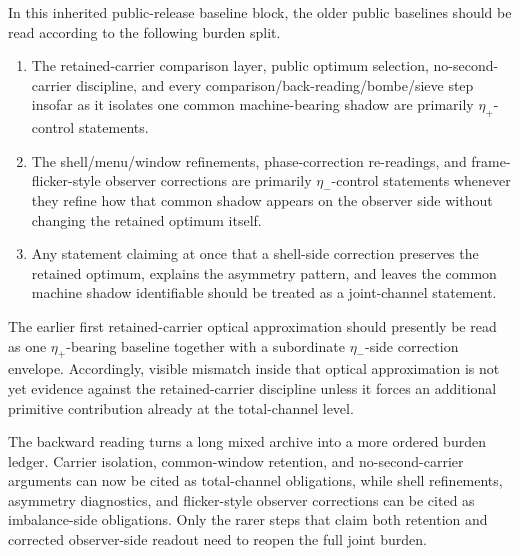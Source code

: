 \begin{proposition}
In this inherited public-release baseline block, the older public baselines should be read according to the following burden split.
\begin{enumerate}[leftmargin=2em]
 \item The retained-carrier comparison layer, public optimum selection, no-second-carrier discipline, and every comparison/back-reading/bombe/sieve step insofar as it isolates one common machine-bearing shadow are primarily \(\eta_+\)-control statements.
 \item The shell/menu/window refinements, phase-correction re-readings, and frame-flicker-style observer corrections are primarily \(\eta_-\)-control statements whenever they refine how that common shadow appears on the observer side without changing the retained optimum itself.
 \item Any statement claiming at once that a shell-side correction preserves the retained optimum, explains the asymmetry pattern, and leaves the common machine shadow identifiable should be treated as a joint-channel statement.
\end{enumerate}
\end{proposition}

\begin{corollary}
The earlier first retained-carrier optical approximation should presently be read as one \(\eta_+\)-bearing baseline together with a subordinate \(\eta_-\)-side correction envelope. Accordingly, visible mismatch inside that optical approximation is not yet evidence against the retained-carrier discipline unless it forces an additional primitive contribution already at the total-channel level.
\end{corollary}

\begin{remark}
The backward reading turns a long mixed archive into a more ordered burden ledger. Carrier isolation, common-window retention, and no-second-carrier arguments can now be cited as total-channel obligations, while shell refinements, asymmetry diagnostics, and flicker-style observer corrections can be cited as imbalance-side obligations. Only the rarer steps that claim both retention and corrected observer-side readout need to reopen the full joint burden.
\end{remark}


